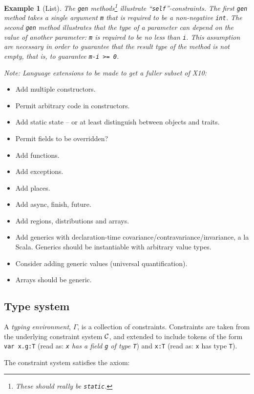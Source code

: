 \documentclass[nocopyrightspace,preprint,10pt]{sigplanconf}
\newtheorem{example}{Example}[section]
\newcommand\Xten{{\sf X10}}
\begin{document}
\begin{example}[List]
The {\tt gen} methods\footnote{These should really be {\tt static}.}
illustrate ``{\tt self}''-constraints. The first {\tt gen} method
takes a single argument {\tt m} that is required to be a non-negative
{\tt int}.  The second {\tt gen} method illustrates that the type of a
parameter can depend on the value of another parameter: {\tt m} is
required to be no less than {\tt i}. This assumption are necessary in
order to guarantee that the result type of the method is not empty,
that is, to guarantee {\tt m-i >= 0}.
\end{example}

{\em Note:
Language extensions to be made to get a fuller subset of \Xten:

\begin{itemize}
  \item Add multiple constructors.
  \item Permit arbitrary code in constructors.
  \item Add static state -- or at least distinguish between objects and traits.
  \item Permit fields to be overridden?
  \item Add functions.
  \item Add exceptions.
  \item Add places.
  \item Add async, finish, future.
  \item Add regions, distributions and arrays.
  \item Add generics with declaration-time
  covariance/contravariance/invariance, a la Scala.  Generics should
  be instantiable with arbitrary value types.
  \item Consider adding generic values (universal quantification).
  \item Arrays should be generic.
\end{itemize}
}

\subsection{Type system}

A {\em typing environment}, $\Gamma$, is a collection of
constraints. Constraints are taken from the underlying constraint
system $\cal C$, and extended to include tokens of the form {\tt var
x.g:T} (read as: {\em {\tt x} has a field {\tt g} of type {\tt T}}) 
and {\tt x:T} (read as: {\tt x} has type {\tt T}).

The constraint system satisfies the axiom:
\end{document}
